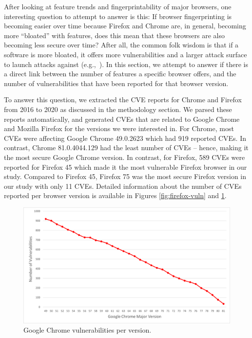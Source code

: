 After looking at feature trends and fingerprintability of major
browsers, one interesting question to attempt to answer is this: If
browser fingerprinting is becoming easier over time because Firefox
and Chrome are, in general, becoming more ``bloated'' with features,
does this mean that these browsers are also becoming less secure over
time?  After all, the common folk wisdom is that if a software is more
bloated, it offers more vulnerabilities and a larger attack surface to
launch attacks against (e.g.,~\cite{Bloating}). In this section, we
attempt to answer if there is a direct link between the number of
features a specific browser offers, and the number of vulnerabilities
that have been reported for that browser version.

To answer this question, we extracted the CVE reports for Chrome and
Firefox from 2016 to 2020 as discussed in the methodology section. We
parsed these reports automatically, and generated CVEs that are
related to Google Chrome and Mozilla Firefox for the versions we were
interested in. For Chrome, most CVEs were affecting Google Chrome
49.0.2623 which had 919 reported CVEs. In contrast, Chrome
81.0.4044.129 had the least number of CVEs -- hence, making it the
most secure Google Chrome version. In contrast, for Firefox, 589 CVEs
were reported for Firefox 45 which made it the most vulnerable Firefox
browser in our study. Compared to Firefox 45, Firefox 75 was the most
secure Firefox version in our study with only 11 CVEs. Detailed
information about the number of CVEs reported per browser version is
available in Figures \ref{fig:firefox-vuln} and \ref{fig:chrome-vuln}.

\begin{figure}[ht]
    \centering
    \includegraphics[width=\columnwidth]{figures/Chrome-Vulnerabilities.png}
    \caption{Google Chrome vulnerabilities per version.}
    \label{fig:chrome-vuln}
\end{figure}

